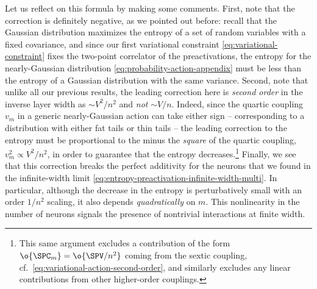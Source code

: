 Let us reflect on this formula by making some comments. First, note that the correction is definitely negative, as we pointed out before: recall that the Gaussian distribution maximizes the entropy of a set of random variables with a fixed covariance, and since our first variational constraint \eqref{eq:variational-constraint} fixes the two-point correlator of the preactivations, the entropy for the nearly-Gaussian distribution \eqref{eq:probability-action-appendix} must be less than the entropy of a Gaussian distribution with the same variance. Second, note that unlike all our previous results, the leading correction here is  \emph{second order} in the inverse layer width as $\sim V^2/n^2$ and  \emph{not} $\sim V/n$. Indeed, since the quartic coupling $v_m$ in a generic nearly-Gaussian action can take either sign -- corresponding to a distribution with either fat tails or thin tails -- the leading correction to the entropy must be proportional to the minus the \emph{square} of the quartic coupling, $v_m^2 \propto V^2/n^2$, in order to guarantee that the entropy decreases.\footnote{This same argument excludes a contribution of the form $\o{\SPC_m} = \o{\SPV/n^2}$ coming from the sextic coupling, cf.~\eqref{eq:variational-action-second-order}, and similarly excludes any linear contributions from other higher-order couplings.
 }
Finally, we see that this correction breaks the perfect additivity for the neurons that we found in the infinite-width limit \eqref{eq:entropy-preactivation-infinite-width-multi}. In particular, although the decrease in the entropy is perturbatively small with an order $1/n^2$ scaling, it also depends \emph{quadratically} on $m$. This 
nonlinearity
in the number of neurons signals the presence of nontrivial interactions at finite width.









